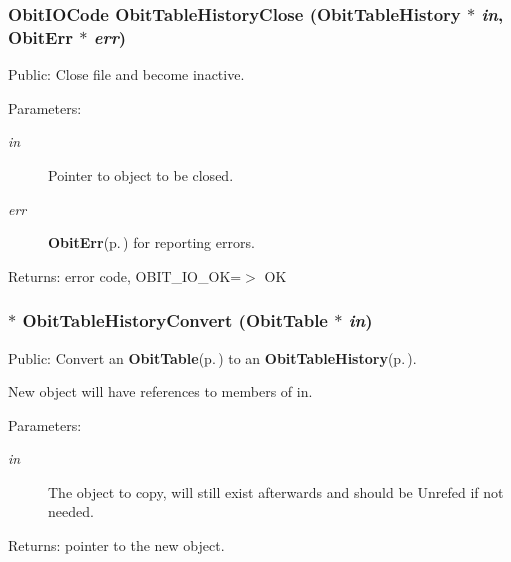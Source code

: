 \subsubsection{\setlength{\rightskip}{0pt plus 5cm}Obit\-IOCode Obit\-Table\-History\-Close ({\bf Obit\-Table\-History} $\ast$ {\em in}, {\bf Obit\-Err} $\ast$ {\em err})}\label{ObitTableHistory_8c_a25}


Public: Close file and become inactive. 

\begin{Desc}
\item[Parameters:]
\begin{description}
\item[{\em in}]Pointer to object to be closed. \item[{\em err}]{\bf Obit\-Err}{\rm (p.\,\pageref{structObitErr})} for reporting errors. \end{description}
\end{Desc}
\begin{Desc}
\item[Returns:]error code, OBIT\_\-IO\_\-OK=$>$ OK \end{Desc}
\subsubsection{$\ast$ Obit\-Table\-History\-Convert ({\bf Obit\-Table} $\ast$ {\em in})}\label{ObitTableHistory_8c_a19}


Public: Convert an {\bf Obit\-Table}{\rm (p.\,\pageref{structObitTable})} to an {\bf Obit\-Table\-History}{\rm (p.\,\pageref{structObitTableHistory})}. 

New object will have references to members of in. \begin{Desc}
\item[Parameters:]
\begin{description}
\item[{\em in}]The object to copy, will still exist afterwards and should be Unrefed if not needed. \end{description}
\end{Desc}
\begin{Desc}
\item[Returns:]pointer to the new object. \end{Desc}
